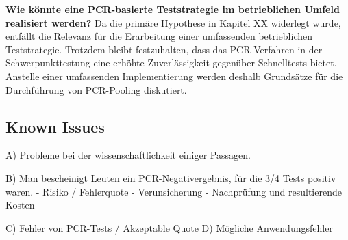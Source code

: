 \textbf{Wie könnte eine PCR-basierte Teststrategie im betrieblichen Umfeld realisiert werden?}
Da die primäre Hypothese in Kapitel XX widerlegt wurde, entfällt die Relevanz für die Erarbeitung einer umfassenden betrieblichen Teststrategie.
Trotzdem bleibt festzuhalten, dass das PCR-Verfahren in der Schwerpunkttestung eine erhöhte Zuverlässigkeit gegenüber Schnelltests bietet.
Anstelle einer umfassenden Implementierung werden deshalb Grundsätze für die Durchführung von PCR-Pooling diskutiert.

\subsection{Known Issues}
A) Probleme bei der wissenschaftlichkeit einiger Passagen.

B) Man bescheinigt Leuten ein PCR-Negativergebnis, für die 3/4 Tests positiv waren.
- Risiko / Fehlerquote
- Verunsicherung
- Nachprüfung und resultierende Kosten

C) Fehler von PCR-Tests / Akzeptable Quote
D) Mögliche Anwendungsfehler
\fi

